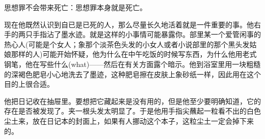 思想罪不会带来死亡：思想罪本身就是死亡。


现在他既然认识到自已是已死的人，那么尽量长久地活着就是一件重要的事。他右手的两只手指沾了墨水迹。就是这样的小事情可能暴露你。部里某一个爱管闲事的热心人(可能是个女人；象那个淡茶色头发的小女人或者小说部里的那个黑头发姑娘那样的人)可能开始怀疑，他为什么在中午吃饭的时候写东西，为什么他用老式钢笔，他在写些什么(what)——然后在有关方面露个暗示。他到浴室里用一块粗糙的深褐色肥皂小心地洗去了墨迹，这种肥皂擦在皮肤上象砂纸一样，因此用在这个目的上很合适。


他把日记收在抽屉里。要想把它藏起来是没有用的，但是他至少要明确知道，它的存在是否被发现了。夹一根头发太明显了。于是他用手指尖蘸起一粒看不出的白色尘土来，放在日记本的封面上，如果有人挪动这个本子，这粒尘土一定会掉下来的。